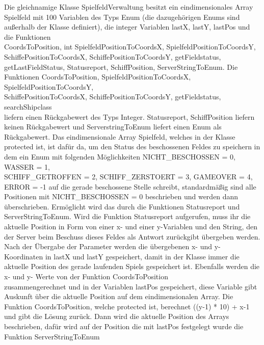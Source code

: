 Die gleichnamige Klasse SpielfeldVerwaltung besitzt ein eindimensionales Array \\Spielfeld mit 100 Variablen des Typs Enum
(die dazugehörigen Enums sind außerhalb der Klasse definiert), die integer Variablen lastX, lastY, lastPos und die Funktionen \\CoordsToPosition, int SpielfeldPositionToCoordsX, 
SpielfeldPositionToCoordsY, \\SchiffePositionToCoordsX, SchiffePositionToCoordsY, getFieldstatus, \\getLastFieldStatus, Statusreport, SchiffPosition, ServerStringToEnum.
Die Funktionen CoordsToPosition, SpielfeldPositionToCoordsX, SpielfeldPositionToCoordsY, \\SchiffePositionToCoordsX, SchiffePositionToCoordsY, getFieldstatus, searchShipclass 
\\liefern einen Rückgabewert des Typs Integer. 
Statusreport, SchiffPosition liefern \\keinen Rückgabewert und ServerstringToEnum liefert einen Enum als Rückgabewert. 
Das eindimensionale Array Spielfeld, welches in der Klasse protected ist, ist dafür da, um den Status des beschossenen Feldes zu speichern in dem ein Enum mit folgenden Möglichkeiten 
NICHT\_BESCHOSSEN = 0, WASSER = 1, \\SCHIFF\_GETROFFEN = 2, SCHIFF\_ZERSTOERT = 3, GAMEOVER = 4, \\ERROR = -1 auf die gerade beschossene Stelle schreibt, standardmäßig sind alle 
\\Positionen mit NICHT\_BESCHOSSEN = 0 beschrieben und werden dann überschrieben. Ermöglicht wird das durch die Funktionen Statusreport und ServerStringToEnum. Wird die Funktion 
Statusreport aufgerufen, muss ihr die aktuelle Position in Form von einer x- und einer y-Variablen und den String, den der Server beim Beschuss dieses Feldes als Antwort 
zurückgibt übergeben werden. Nach der Übergabe der Parameter werden die übergebenen x- und y- Koordinaten in lastX und lastY gespeichert, damit in der Klasse immer die aktuelle 
Position des gerade laufenden Spiels gespeichert ist. Ebenfalls werden die x- und y- Werte von der Funktion CoordsToPosition \\zusammengerechnet und in der Variablen lastPos 
gespeichert, diese Variable gibt Auskunft über die aktuelle Position auf dem eindimensionalen Array. Die Funktion CoordsToPosition, welche protected ist, berechnet ((y-1) * 10) + x-1 
und gibt die Lösung zurück. Dann wird die aktuelle Position des Arrays beschrieben, dafür wird auf der Position die mit lastPos festgelegt wurde die Funktion ServerStringToEnum 
